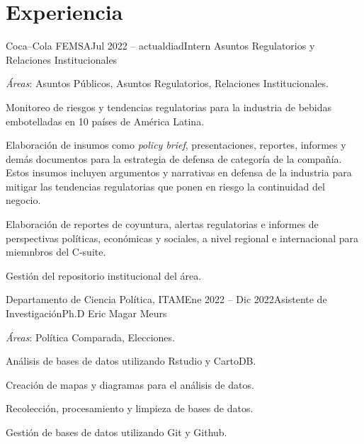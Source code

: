 \documentclass[letter]{resume}
\begin{document}
\section{Experiencia}
\begin{content}

\begin{position}{Coca–Cola FEMSA}{Jul 2022 -- actualdiad}{Intern Asuntos Regulatorios y Relaciones Institucionales}{}{}

  \item {\emph{Áreas}}: Asuntos Públicos, Asuntos Regulatorios, Relaciones Institucionales.
  \item Monitoreo de riesgos y tendencias regulatorias para la industria de bebidas embotelladas en 10 países de América Latina.
  \item Elaboración de insumos como \emph{policy brief}, presentaciones, reportes, informes y demás documentos para la estrategia de defensa de categoría de la compañía. Estos insumos incluyen argumentos y narrativas en defensa de la industria para mitigar las tendencias regulatorias que ponen en riesgo la continuidad del negocio. 
  \item Elaboración de reportes de coyuntura, alertas regulatorias e informes de perspectivas políticas, económicas y sociales, a nivel regional e internacional para miemnbros del C-suite.
  \item Gestión del repositorio institucional del área.

\end{position}
\vspace{-.0001 \baselineskip}

\begin{position}{Departamento de Ciencia Política, ITAM}{Ene 2022 -- Dic 2022}{Asistente de Investigación}{Ph.D Eric Magar Meurs}{}

  \item {\emph{Áreas}}: Política Comparada, Elecciones.
  \item Análisis de bases de datos utilizando Rstudio y CartoDB.
  \item Creación de mapas y diagramas para el análisis de datos.
  \item Recolección, procesamiento y limpieza de bases de datos.
  \item Gestión de bases de datos utilizando Git y Github.

\end{position}
\vspace{-.0001 \baselineskip}

\sectionlineskip
\end{content}
\end{document}
